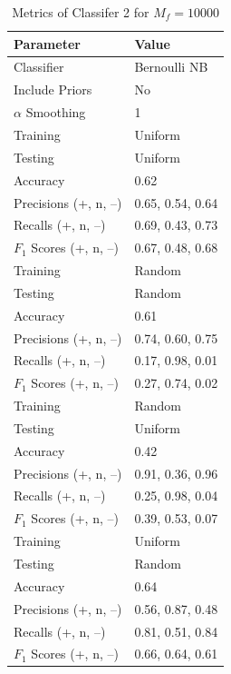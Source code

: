 \documentclass[11pt]{article}
\begin{document}
\begin{table}[!h]
	\begin{center}
		\begin{tabular}{|l|l|}			
			\hline
			Parameter & Value \\
			\hline\hline
			Classifier & Bernoulli NB \\
			Include Priors & No \\
			$\alpha$ Smoothing & 1 \\
			\hline\hline
			Training & Uniform \\
			Testing & Uniform \\
			\hline
			Accuracy & 0.62 \\
			Precisions (+, n, --) &  0.65, 0.54, 0.64 \\
			Recalls (+, n, --) & 0.69, 0.43, 0.73 \\
			$F_1$ Scores (+, n, --) & 0.67, 0.48, 0.68 \\
			\hline\hline
			Training & Random \\
			Testing & Random \\
			\hline
			Accuracy & 0.61 \\
			Precisions (+, n, --) &  0.74, 0.60, 0.75 \\
			Recalls (+, n, --) & 0.17, 0.98, 0.01 \\
			$F_1$ Scores (+, n, --) & 0.27, 0.74, 0.02 \\
			\hline\hline
			Training & Random \\
			Testing & Uniform \\
			\hline
			Accuracy & 0.42 \\
			Precisions (+, n, --) &  0.91, 0.36, 0.96 \\
			Recalls (+, n, --) & 0.25, 0.98, 0.04 \\
			$F_1$ Scores (+, n, --) & 0.39, 0.53, 0.07 \\
			\hline\hline
			Training & Uniform \\
			Testing & Random \\
			\hline
			Accuracy & 0.64 \\
			Precisions (+, n, --) &  0.56, 0.87, 0.48 \\
			Recalls (+, n, --) & 0.81, 0.51, 0.84 \\
			$F_1$ Scores (+, n, --) & 0.66, 0.64, 0.61 \\
			\hline
		\end{tabular}
		\caption{Metrics of Classifer 2 for $M_f = 10000$}
		\label{tbl:metrics-2nd10000}
	\end{center}
\end{table}
\end{document}
